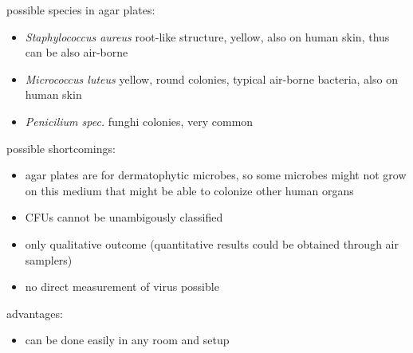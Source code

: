 \documentclass[hyperref]{labbook}
\begin{document}
possible species in agar plates:
\begin{itemize}
\item \textit{Staphylococcus aureus} root-like structure, yellow, also on human skin, thus can be also air-borne
\item \textit{Micrococcus luteus} yellow, round colonies, typical air-borne bacteria, also on human skin
\item \textit{Penicilium spec.} funghi colonies, very common
\end{itemize}
possible shortcomings:
\begin{itemize}
\item agar plates are for dermatophytic microbes, so some microbes might not grow on this medium that might be able to colonize other human organs
\item CFUs cannot be unambigously classified
\item only qualitative outcome (quantitative results could be obtained through air samplers)
\item no direct measurement of virus possible
\end{itemize}
advantages:
\begin{itemize}
\item can be done easily in any room and setup
\end{itemize}
\end{document}
